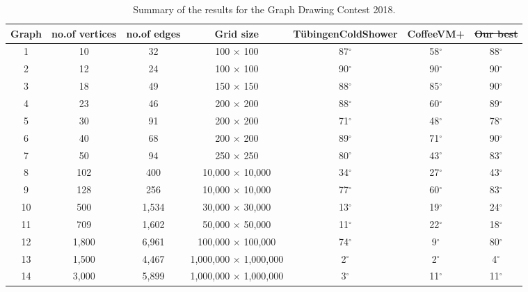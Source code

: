 \documentclass{comjnl}
\providecommand{\DIFaddtex}[1]{{\protect\color{blue}\uwave{#1}}} %
\providecommand{\DIFdeltex}[1]{{\protect\color{red}\sout{#1}}}                      %
\providecommand{\DIFaddFL}[1]{\DIFadd{#1}} %
\providecommand{\DIFdelFL}[1]{\DIFdel{#1}} %
\providecommand{\DIFaddbeginFL}{} %
\providecommand{\DIFaddendFL}{} %
\providecommand{\DIFdelbeginFL}{} %
\providecommand{\DIFdelendFL}{} %
\providecommand{\DIFadd}[1]{\texorpdfstring{\DIFaddtex{#1}}{#1}} %
\providecommand{\DIFdel}[1]{\texorpdfstring{\DIFdeltex{#1}}{}} %
\newcommand{\DIFscaledelfig}{0.5}
\newlength{\DIFdelgraphicswidth} %
\newlength{\DIFdelgraphicsheight} %
\newcommand{\DIFaddincludegraphics}[2][]{{\color{blue}\fbox{\DIFOincludegraphics[#1]{#2}}}} %
\newcommand{\DIFdelincludegraphics}[2][]{%
\sbox{\DIFdelgraphicsbox}{\DIFOincludegraphics[#1]{#2}}%
\settoboxwidth{\DIFdelgraphicswidth}{\DIFdelgraphicsbox} %
\settoboxtotalheight{\DIFdelgraphicsheight}{\DIFdelgraphicsbox} %
\scalebox{\DIFscaledelfig}{%
\parbox[b]{\DIFdelgraphicswidth}{\usebox{\DIFdelgraphicsbox}\\[-\baselineskip] \rule{\DIFdelgraphicswidth}{0em}}\llap{\resizebox{\DIFdelgraphicswidth}{\DIFdelgraphicsheight}{%
\setlength{\unitlength}{\DIFdelgraphicswidth}%
\begin{picture}(1,1)%
\thicklines\linethickness{2pt} %
{\color[rgb]{1,0,0}\put(0,0){\framebox(1,1){}}}%
{\color[rgb]{1,0,0}\put(0,0){\line( 1,1){1}}}%
{\color[rgb]{1,0,0}\put(0,1){\line(1,-1){1}}}%
\end{picture}%
}\hspace*{3pt}}} %
} %
\DeclareRobustCommand{\DIFaddbeginFL}{\DIFOaddbeginFL \let\includegraphics\DIFaddincludegraphics} %
\DeclareRobustCommand{\DIFaddendFL}{\DIFOaddendFL \let\includegraphics\DIFOincludegraphics} %
\DeclareRobustCommand{\DIFdelbeginFL}{\DIFOdelbeginFL \let\includegraphics\DIFdelincludegraphics} %
\DeclareRobustCommand{\DIFdelendFL}{\DIFOaddendFL \let\includegraphics\DIFOincludegraphics} %
\begin{document}
\begin{table}
\caption{Summary of the results for the Graph Drawing Contest 2018.}
\centering
\DIFaddbeginFL \begin{adjustbox}{width=1\textwidth}
\DIFaddendFL \begin{tabular}{c|c|c|c|c|c|c}
\toprule
\rowcolor{gray!30!} Graph & no.\DIFaddbeginFL \DIFaddFL{~}\DIFaddendFL of vertices & no.\DIFaddbeginFL \DIFaddFL{~}\DIFaddendFL of edges  & Grid size & T\"ubingenColdShower & CoffeeVM+ & \DIFdelbeginFL \DIFdelFL{Our best }\DIFdelendFL \DIFaddbeginFL \DIFaddFL{No-time restriction }\DIFaddendFL \\
\midrule
\rowcolor{gray!30!} 1  & 10    & 32    & 100 $\times$ 100             & 87$^\circ$ & 58$^\circ$ & 88$^\circ$\\
\rowcolor{gray!00!} 2  & 12    & 24    & 100 $\times$ 100             & 90$^\circ$ & 90$^\circ$ & 90$^\circ$\\
\rowcolor{gray!30!} 3  & 18    & 49    & 150 $\times$ 150             & 88$^\circ$ & 85$^\circ$ & 90$^\circ$\\
\rowcolor{gray!00!} 4  & 23    & 46    & 200 $\times$ 200             & 88$^\circ$ & 60$^\circ$ & 89$^\circ$\\
\rowcolor{gray!30!} 5  & 30    & 91    & 200 $\times$ 200             & 71$^\circ$ & 48$^\circ$ & 78$^\circ$\\
\rowcolor{gray!00!} 6  & 40    & 68    & 200 $\times$ 200             & 89$^\circ$ & 71$^\circ$ & 90$^\circ$\\
\rowcolor{gray!30!} 7  & 50    & 94    & 250 $\times$ 250             & 80$^\circ$ & 43$^\circ$ & 83$^\circ$\\
\rowcolor{gray!00!} 8  & 102   & 400   & 10,000 $\times$ 10,000       & 34$^\circ$ & 27$^\circ$ & 43$^\circ$\\
\rowcolor{gray!30!} 9  & 128   & 256   & 10,000 $\times$ 10,000       & 77$^\circ$ & 60$^\circ$ & 83$^\circ$\\
\rowcolor{gray!00!} 10 & 500   & 1,534 & 30,000 $\times$ 30,000       & 13$^\circ$ & 19$^\circ$ & 24$^\circ$\\
\rowcolor{gray!30!} 11 & 709   & 1,602 & 50,000 $\times$ 50,000       & 11$^\circ$ & 22$^\circ$ & 18$^\circ$\\
\rowcolor{gray!00!} 12 & 1,800 & 6,961 & 100,000 $\times$ 100,000     & 74$^\circ$ &  9$^\circ$ & 80$^\circ$\\
\rowcolor{gray!30!} 13 & 1,500 & 4,467 & 1,000,000 $\times$ 1,000,000 &  2$^\circ$ &  2$^\circ$ & 4$^\circ$\\
\rowcolor{gray!00!} 14 & 3,000 & 5,899 & 1,000,000 $\times$ 1,000,000 &  3$^\circ$ & 11$^\circ$ & 11$^\circ$\\
\bottomrule
\end{tabular}
\DIFaddbeginFL \end{adjustbox}
\DIFaddendFL \label{tab:gdContest2018}
\end{table}
\end{document}
